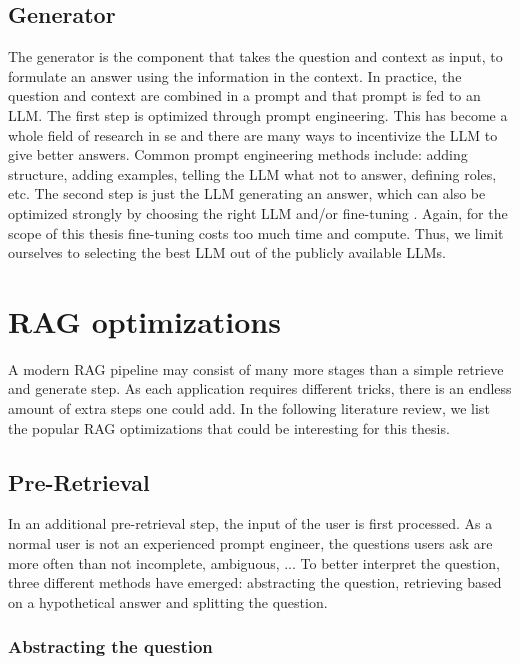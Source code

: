 \subsection{Generator}
The generator is the component that takes the question and context as input, to formulate an answer using the information in the context. In practice, the question and context are combined in a prompt and that prompt is fed to an LLM. The first step is optimized through prompt engineering. This has become a whole field of research in se and there are many ways to incentivize the LLM to give better answers. Common prompt engineering methods include: adding structure, adding examples, telling the LLM what not to answer, defining roles, etc. \cite{brown2020language, chen2023unleashing, white2023prompt} The second step is just the LLM generating an answer, which can also be optimized strongly by choosing the right LLM and/or fine-tuning \cite{han2024parameter, xu2023parameter}. Again, for the scope of this thesis fine-tuning costs too much time and compute. Thus, we limit ourselves to selecting the best LLM out of the publicly available LLMs.

\section{RAG optimizations}
A modern RAG pipeline may consist of many more stages than a simple retrieve and generate step. As each application requires different tricks, there is an endless amount of extra steps one could add. In the following literature review, we list the popular RAG optimizations that could be interesting for this thesis.

\subsection{Pre-Retrieval}
\label{sec:pre_retrieval}
In an additional pre-retrieval step, the input of the user is first processed. As a normal user is not an experienced prompt engineer, the questions users ask are more often than not incomplete, ambiguous, ... To better interpret the question, three different methods have emerged: abstracting the question, retrieving based on a hypothetical answer and splitting the question.

\subsubsection{Abstracting the question}

